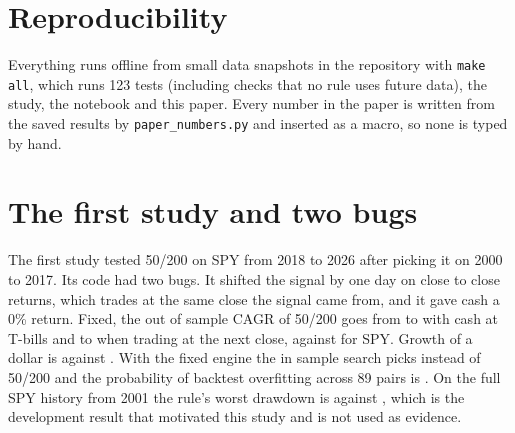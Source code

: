 \documentclass[11pt]{article}
\begin{document}
\section{Reproducibility}

Everything runs offline from small data snapshots in the repository with \texttt{make all}, which runs 123 tests (including checks that no rule uses future data), the study, the notebook and this paper. Every number in the paper is written from the saved results by \texttt{paper\_numbers.py} and inserted as a macro, so none is typed by hand.

\appendix
\section{The first study and two bugs}\label{app:spy}

The first study tested 50/200 on SPY from 2018 to 2026 after picking it on 2000 to 2017. Its code had two bugs. It shifted the signal by one day on close to close returns, which trades at the same close the signal came from, and it gave cash a 0\% return. Fixed, the out of sample CAGR of 50/200 goes from  to  with cash at T-bills and to  when trading at the next close, against  for SPY. Growth of a dollar is  against . With the fixed engine the in sample search picks  instead of 50/200 and the probability of backtest overfitting across 89 pairs is . On the full SPY history from 2001 the rule's worst drawdown is  against , which is the development result that motivated this study and is not used as evidence.
\end{document}
